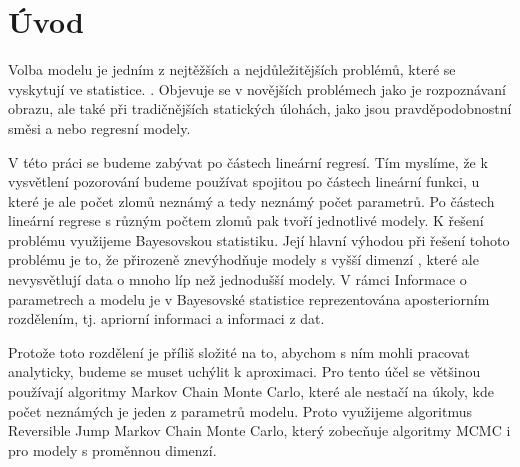 \documentclass[czech,master,public,dept470,male,cpdeclaration,oneside, python]{diploma}
\begin{document}
\MakeTitlePages
\lstlistoflistings

\section{Úvod}
Volba modelu je jedním z nejtěžších a nejdůležitějších problémů, které se vyskytují ve statistice.
. Objevuje se v novějších problémech jako je rozpoznávaní obrazu, ale také při tradičnějších statických úlohách, jako jsou pravděpodobnostní směsi a nebo regresní modely. \par
V této práci se budeme zabývat po částech lineární regresí. Tím myslíme, že k vysvětlení pozorování budeme používat spojitou po částech lineární funkci, u které je ale počet zlomů neznámý a tedy neznámý počet parametrů. Po částech lineární regrese s různým počtem zlomů pak tvoří jednotlivé modely. K řešení problému využijeme Bayesovskou statistiku. Její hlavní výhodou při řešení tohoto problému je to, že přirozeně znevýhodňuje modely s vyšší dimenzí \cite{robert2007bayesian}, které ale nevysvětlují data o mnoho líp než jednodušší modely. V rámci Informace o parametrech a modelu je v Bayesovské statistice reprezentována aposteriorním rozdělením, tj. apriorní informaci a informaci z dat. \par
Protože toto rozdělení je příliš složité na to, abychom s ním mohli pracovat analyticky, budeme se muset uchýlit k aproximaci. Pro tento účel se většinou používají algoritmy Markov Chain Monte Carlo, které ale nestačí na úkoly, kde počet neznámých je jeden z parametrů modelu.  Proto využijeme algoritmus Reversible Jump Markov Chain Monte Carlo, který zobecňuje algoritmy MCMC i pro modely s proměnnou dimenzí.
\end{document}
